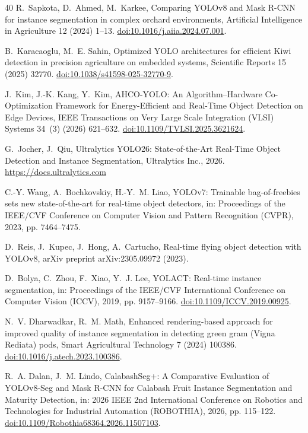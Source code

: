 \documentclass[5p,times]{elsarticle}
\begin{document}
\begin{thebibliography}{40}
R.~Sapkota, D.~Ahmed, M.~Karkee, Comparing YOLOv8 and Mask R-CNN for instance
  segmentation in complex orchard environments, Artificial Intelligence in
  Agriculture 12 (2024) 1--13. \href{https://doi.org/10.1016/j.aiia.2024.07.001}{doi:10.1016/j.aiia.2024.07.001}.

B.~Karacaoglu, M.~E. Sahin, Optimized YOLO architectures for efficient Kiwi
  detection in precision agriculture on embedded systems, Scientific Reports 15
  (2025) 32770. \href{https://doi.org/10.1038/s41598-025-32770-9}{doi:10.1038/s41598-025-32770-9}.

J.~Kim, J.-K. Kang, Y.~Kim, AHCO-YOLO: An Algorithm--Hardware Co-Optimization
  Framework for Energy-Efficient and Real-Time Object Detection on Edge
  Devices, IEEE Transactions on Very Large Scale Integration (VLSI) Systems
  34~(3) (2026) 621--632. \href{https://doi.org/10.1109/TVLSI.2025.3621624}{doi:10.1109/TVLSI.2025.3621624}.

G.~Jocher, J.~Qiu, Ultralytics YOLO26: State-of-the-Art Real-Time Object
  Detection and Instance Segmentation, Ultralytics Inc., 2026.
\newline\urlprefix\url{https://docs.ultralytics.com}

C.-Y. Wang, A.~Bochkovskiy, H.-Y.~M. Liao, YOLOv7: Trainable bag-of-freebies
  sets new state-of-the-art for real-time object detectors, in: Proceedings of
  the IEEE/CVF Conference on Computer Vision and Pattern Recognition (CVPR),
  2023, pp. 7464--7475.

D.~Reis, J.~Kupec, J.~Hong, A.~Cartucho, Real-time flying object detection with
  YOLOv8, arXiv preprint arXiv:2305.09972 (2023).

D.~Bolya, C.~Zhou, F.~Xiao, Y.~J. Lee, YOLACT: Real-time instance segmentation,
  in: Proceedings of the IEEE/CVF International Conference on Computer Vision
  (ICCV), 2019, pp. 9157--9166. \href{https://doi.org/10.1109/ICCV.2019.00925}{doi:10.1109/ICCV.2019.00925}.

N.~V. Dharwadkar, R.~M. Math, Enhanced rendering-based approach for improved
  quality of instance segmentation in detecting green gram (Vigna Rediata)
  pods, Smart Agricultural Technology 7 (2024) 100386. \href{https://doi.org/10.1016/j.atech.2023.100386}{doi:10.1016/j.atech.2023.100386}.

R.~A. Dalan, J.~M. Lindo, CalabashSeg+: A Comparative Evaluation of YOLOv8-Seg
  and Mask R-CNN for Calabash Fruit Instance Segmentation and Maturity
  Detection, in: 2026 IEEE 2nd International Conference on Robotics and
  Technologies for Industrial Automation (ROBOTHIA), 2026, pp. 115--122. \href{https://doi.org/10.1109/Robothia68364.2026.11507103}{doi:10.1109/Robothia68364.2026.11507103}.


\end{thebibliography}
\end{document}
